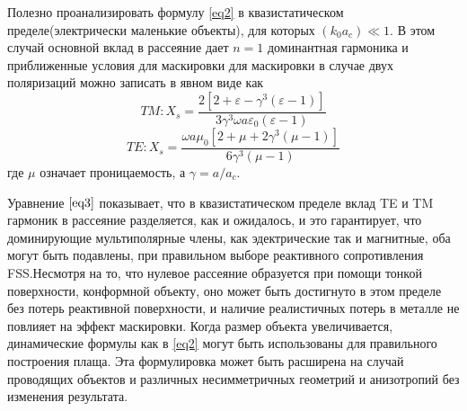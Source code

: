 \documentclass[12pt,a4paper]{article}
\begin{document}
Полезно проанализировать формулу \ref{eq2} в квазистатическом пределе(электрически маленькие 
объекты), для которых $(k_0a_c) \ll 1$. В этом случай основной вклад в рассеяние дает
$n=1$ доминантная гармоника и приближенные условия для маскировки для маскировки в 
случае двух поляризаций можно записать в явном виде как
\begin{equation*}
TM:X_s = 
\frac{2[2+\varepsilon-\gamma^3(\varepsilon-1)]}{3\gamma^3\omega a\varepsilon_0(\varepsilon-1)
}
\end{equation*}
\begin{equation}\label{eq3}
TE:X_s = \frac{\omega a\mu_0[2+\mu+2\gamma^3(\mu-1)]}{6\gamma^3(\mu-1)}
\end{equation}
где $\mu$ означает проницаемость, а $\gamma=a/a_c$.

Уравнение $\ref{eq3}$ показывает, что в квазистатическом пределе вклад TE и TM гармоник в 
рассеяние разделяется, как и ожидалось, и это гарантирует, что доминирующие мультиполярные
члены, как эдектрические так и магнитные, оба могут быть подавлены, при правильном выборе
реактивного сопротивления FSS.Несмотря на то, что нулевое рассеяние образуется при помощи 
тонкой поверхности, конформной объекту, оно может быть достигнуто в этом пределе без потерь 
реактивной поверхности, и наличие реалистичных потерь в металле не повлияет на эффект 
маскировки. Когда размер объекта увеличивается, динамические формулы как в \ref{eq2} могут
быть использованы для правильного построения плаща. Эта формулировка может быть расширена на
случай проводящих объектов и различных несимметричных геометрий и анизотропий без изменения
результата.
\end{document}
